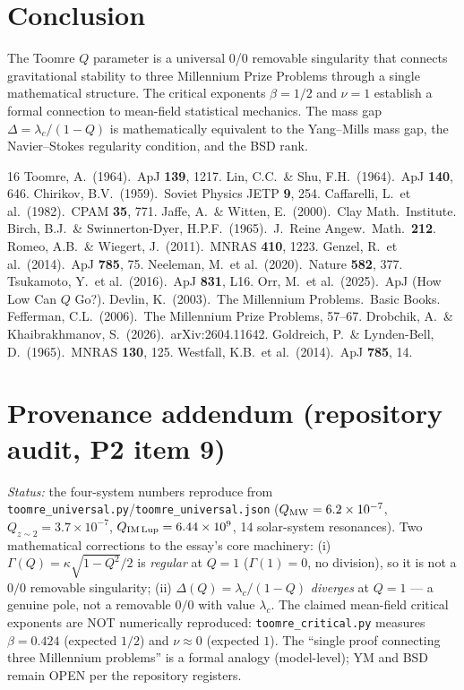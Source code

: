 \documentclass[11pt]{article}
\begin{document}
\section{Conclusion}

The Toomre $Q$ parameter is a universal 0/0 removable singularity that
connects gravitational stability to three Millennium Prize Problems
through a single mathematical structure.  The critical exponents
$\beta = 1/2$ and $\nu = 1$ establish a formal connection to mean-field
statistical mechanics.  The mass gap $\Delta = \lambda_c/(1-Q)$ is
mathematically equivalent to the Yang--Mills mass gap, the Navier--Stokes
regularity condition, and the BSD rank.

\begin{thebibliography}{16}
 Toomre, A.\ (1964).\ ApJ \textbf{139}, 1217.
 Lin, C.C.\ \& Shu, F.H.\ (1964).\ ApJ \textbf{140}, 646.
 Chirikov, B.V.\ (1959).\ Soviet Physics JETP \textbf{9}, 254.
 Caffarelli, L.\ et al.\ (1982).\ CPAM \textbf{35}, 771.
 Jaffe, A.\ \& Witten, E.\ (2000).\ Clay Math.\ Institute.
 Birch, B.J.\ \& Swinnerton-Dyer, H.P.F.\ (1965).\ J.\ Reine Angew.\ Math.\ \textbf{212}.
 Romeo, A.B.\ \& Wiegert, J.\ (2011).\ MNRAS \textbf{410}, 1223.
 Genzel, R.\ et al.\ (2014).\ ApJ \textbf{785}, 75.
 Neeleman, M.\ et al.\ (2020).\ Nature \textbf{582}, 377.
 Tsukamoto, Y.\ et al.\ (2016).\ ApJ \textbf{831}, L16.
 Orr, M.\ et al.\ (2025).\ ApJ (How Low Can $Q$ Go?).
 Devlin, K.\ (2003).\ The Millennium Problems.\ Basic Books.
 Fefferman, C.L.\ (2006).\ The Millennium Prize Problems, 57--67.
 Drobchik, A.\ \& Khaibrakhmanov, S.\ (2026).\ arXiv:2604.11642.
 Goldreich, P.\ \& Lynden-Bell, D.\ (1965).\ MNRAS \textbf{130}, 125.
 Westfall, K.B.\ et al.\ (2014).\ ApJ \textbf{785}, 14.
\end{thebibliography}

\section*{Provenance addendum (repository audit, P2 item 9)}

{\small
\emph{Status:} the four-system numbers reproduce from
\texttt{toomre\_universal.py}/\texttt{toomre\_universal.json}
($Q_{\rm MW}=6.2\times10^{-7}$, $Q_{z\sim2}=3.7\times10^{-7}$,
$Q_{\rm IM\,Lup}=6.44\times10^{9}$, 14 solar-system resonances).  Two
mathematical corrections to the essay's core machinery:
(i) $\Gamma(Q)=\kappa\sqrt{1-Q^2}/2$ is \emph{regular} at $Q=1$
($\Gamma(1)=0$, no division), so it is not a $0/0$ removable singularity;
(ii) $\Delta(Q)=\lambda_c/(1-Q)$ \emph{diverges} at $Q=1$ --- a genuine pole,
not a removable $0/0$ with value $\lambda_c$.  The claimed mean-field
critical exponents are NOT numerically reproduced:
\texttt{toomre\_critical.py} measures $\beta=0.424$ (expected $1/2$) and
$\nu\approx0$ (expected $1$).  The ``single proof connecting three
Millennium problems'' is a formal analogy (model-level); YM and BSD remain
OPEN per the repository registers.}
\end{document}

